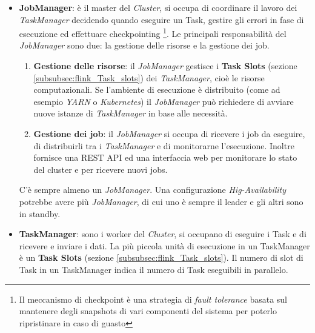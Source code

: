 \begin{itemize}
    \item \textbf{JobManager}: è il master del \textit{Cluster}, si occupa di coordinare il lavoro dei \textit{TaskManager} decidendo quando eseguire un Task,
    gestire gli errori in fase di esecuzione ed effettuare checkpointing 
    \footnote{Il meccanismo di checkpoint è una strategia di \textit{fault tolerance} basata sul mantenere degli snapshots di vari componenti del sistema
    per poterlo ripristinare in caso di guasto}.
    Le principali responsabilità del \textit{JobManager} sono due: la gestione delle risorse e la gestione dei job.
    \begin{enumerate}
        \item \textbf{Gestione delle risorse}: il \textit{JobManager} gestisce i \textbf{Task Slots} (sezione \ref{subsubsec:flink_Task_slots}) dei \textit{TaskManager}, cioè le risorse computazionali.
        Se l'ambiente di esecuzione è distribuito (come ad esempio \textit{YARN} o \textit{Kubernetes}) il \textit{JobManager} può richiedere di avviare nuove istanze di \textit{TaskManager} in base alle necessità.
        \item \textbf{Gestione dei job}: il \textit{JobManager} si occupa di ricevere i job da eseguire, di distribuirli tra i \textit{TaskManager} e di monitorarne l'esecuzione.
        Inoltre fornisce una REST API ed una interfaccia web per monitorare lo stato del cluster e per ricevere nuovi jobs.
    \end{enumerate}
    C'è sempre almeno un \textit{JobManager}. Una configurazione \textit{Hig-Availability} potrebbe avere più \textit{JobManager}, di cui uno è sempre il leader e gli altri sono in standby.
    \item \textbf{TaskManager}: sono i worker del \textit{Cluster}, si occupano di eseguire i Task e di ricevere e inviare i dati.
    La più piccola unità di esecuzione in un TaskManager è un \textbf{Task Slots} (sezione \ref{subsubsec:flink_Task_slots}).
    Il numero di slot di Task in un TaskManager indica il numero di Task eseguibili in parallelo.
\end{itemize}

